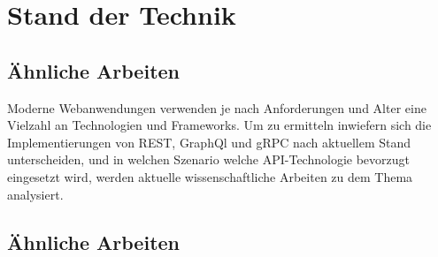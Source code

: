 \chapter{Stand der Technik}
\label{chap:intro}
\chapterstart
\section{Ähnliche Arbeiten}
Moderne Webanwendungen verwenden je nach Anforderungen und Alter eine Vielzahl an Technologien und Frameworks. Um zu ermitteln inwiefern sich die Implementierungen von REST, GraphQl und gRPC nach aktuellem Stand unterscheiden, und in welchen Szenario welche API-Technologie bevorzugt eingesetzt wird, werden aktuelle wissenschaftliche Arbeiten zu dem Thema analysiert.

\section{Ähnliche Arbeiten}



\chapterend